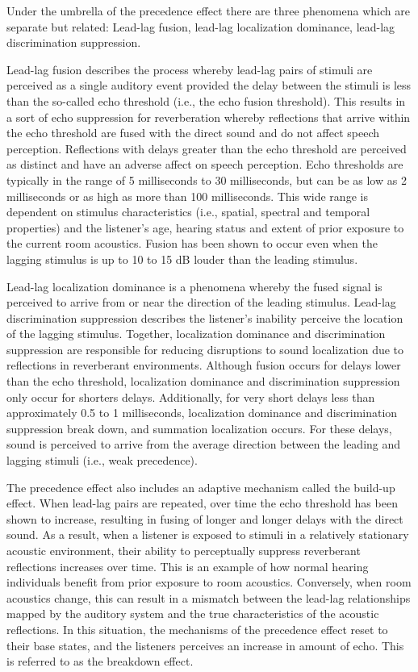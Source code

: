 Under the umbrella of the precedence effect there are three phenomena which are separate but related: Lead-lag fusion, lead-lag localization dominance, lead-lag discrimination suppression. 

Lead-lag fusion describes the process whereby lead-lag pairs of stimuli are perceived as a single auditory event provided the delay between the stimuli is less than the so-called echo threshold (i.e., the echo fusion threshold). This results in a sort of echo suppression for reverberation whereby reflections that arrive within the echo threshold are fused with the direct sound and do not affect speech perception. Reflections with delays greater than the echo threshold are perceived as distinct and have an adverse affect on speech perception. Echo thresholds are typically in the range of 5 milliseconds to 30 milliseconds, but can be as low as 2 milliseconds or as high as more than 100 milliseconds. This wide range is dependent on stimulus characteristics (i.e., spatial, spectral and temporal properties) and the listener's age, hearing status and extent of prior exposure to the current room acoustics. Fusion has been shown to occur even when the lagging stimulus is up to 10 to 15 dB louder than the leading stimulus. 

Lead-lag localization dominance is a phenomena whereby the fused signal is perceived to arrive from or near the direction of the leading stimulus. Lead-lag discrimination suppression describes the listener’s inability perceive the location of the lagging stimulus. Together, localization dominance and discrimination suppression are responsible for reducing disruptions to sound localization due to reflections in reverberant environments. Although fusion occurs for delays lower than the echo threshold, localization dominance and discrimination suppression only occur for shorters delays. Additionally, for very short delays less than approximately 0.5 to 1 milliseconds, localization dominance and discrimination suppression break down, and summation localization occurs. For these delays, sound is perceived to arrive from the average direction between the leading and lagging stimuli (i.e., weak precedence).

The precedence effect also includes an adaptive mechanism called the build-up effect. When lead-lag pairs are repeated, over time the echo threshold has been shown to increase, resulting in fusing of longer and longer delays with the direct sound. As a result, when a listener is exposed to stimuli in a relatively stationary acoustic environment, their ability to perceptually suppress reverberant reflections increases over time. This is an example of how normal hearing individuals benefit from prior exposure to room acoustics. Conversely, when room acoustics change, this can result in a mismatch between the lead-lag relationships mapped by the auditory system and the true characteristics of the acoustic reflections. In this situation, the mechanisms of the precedence effect reset to their base states, and the listeners perceives an increase in amount of echo. This is referred to as the breakdown effect.

